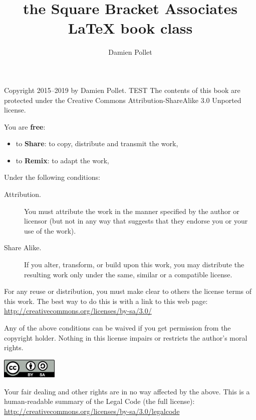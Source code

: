 \documentclass[twoside,openany,showtrims]{sbabook}
\title{the Square Bracket Associates\titlebreak{}
  \texorpdfstring{\protect\LaTeX}{LaTeX} book class}
\author{Damien Pollet}
\date{\gitdate\titlebreak[\smallskip]{ -- }\protect\gitCommitInfo}
\begin{document}
\maketitle
\pagestyle{titlingpage}
\thispagestyle{titlingpage} %

\cleartoverso
{\small

  Copyright 2015--2019 by Damien Pollet.
TEST
  The contents of this book are protected under the Creative Commons
  Attribution-ShareAlike 3.0 Unported license.

  You are \textbf{free}:
  \begin{itemize}
  \item to \textbf{Share}: to copy, distribute and transmit the work,
  \item to \textbf{Remix}: to adapt the work,
  \end{itemize}

  Under the following conditions:
  \begin{description}
  \item[Attribution.] You must attribute the work in the manner specified by the
    author or licensor (but not in any way that suggests that they endorse you
    or your use of the work).
  \item[Share Alike.] If you alter, transform, or build upon this work, you may
    distribute the resulting work only under the same, similar or a compatible
    license.
  \end{description}

  For any reuse or distribution, you must make clear to others the
  license terms of this work. The best way to do this is with a link to
  this web page: \\
  \url{http://creativecommons.org/licenses/by-sa/3.0/}

  Any of the above conditions can be waived if you get permission from
  the copyright holder. Nothing in this license impairs or restricts the
  author's moral rights.

  \begin{center}
    \includegraphics[width=0.2\textwidth]{CreativeCommons-BY-SA.pdf}
  \end{center}

  Your fair dealing and other rights are in no way affected by the
  above. This is a human-readable summary of the Legal Code (the full
  license): \\
  \url{http://creativecommons.org/licenses/by-sa/3.0/legalcode}

}
\end{document}
